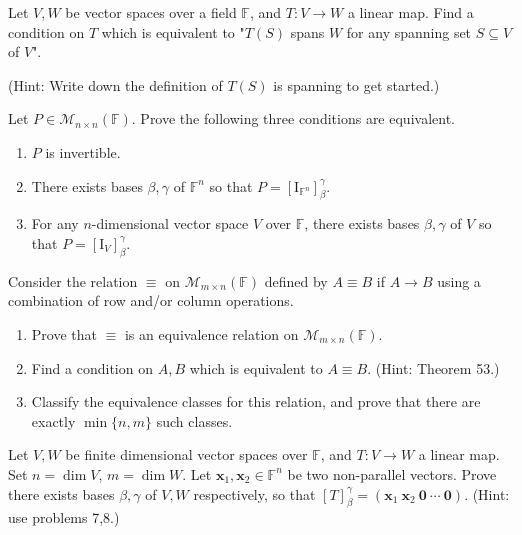 \documentclass{eh-homework}
\begin{document}
    \begin{question}{7}
        Let \( V, W \) be vector spaces over a field \( \mathbb{F} \), and \( T : V \to W \) a linear map. Find a condition on \( T \) which is equivalent to "\( T(S) \) spans \( W \) for any spanning set \( S \subseteq V \) of \( V \)".

        (Hint: Write down the definition of \( T(S) \) is spanning to get started.)
    \end{question}

    \begin{question}{8}
        Let \( P \in \mathcal{M}_{n \times n}(\mathbb{F}) \). Prove the following three conditions are equivalent.

        \begin{enumerate}
            \item \( P \) is invertible.
            \item There exists bases \( \beta, \gamma \) of \( \mathbb{F}^n \) so that \( P = [\mathrm{I}_{\mathbb{F}^n}]_\beta^\gamma \).
            \item For any \( n \)-dimensional vector space \( V \) over \( \mathbb{F} \), there exists bases \( \beta, \gamma \) of \( V \) so that \( P = [\mathrm{I}_V]_\beta^\gamma \).
        \end{enumerate}
    \end{question}

    \begin{question}{9}
        Consider the relation \( \equiv \) on \( \mathcal{M}_{m \times n}(\mathbb{F}) \) defined by \( A \equiv B \) if \( A \to B \) using a combination of row and/or column operations.

        \begin{enumerate}
            \item Prove that \( \equiv \) is an equivalence relation on \( \mathcal{M}_{m \times n}(\mathbb{F}) \).
            \item Find a condition on \( A, B \) which is equivalent to \( A \equiv B \). (Hint: Theorem 53.)
            \item Classify the equivalence classes for this relation, and prove that there are exactly \( \min\{n, m\} \) such classes.
        \end{enumerate}
    \end{question}

    \begin{question}{10}
        Let \( V, W \) be finite dimensional vector spaces over \( \mathbb{F} \), and \( T : V \to W \) a linear map. Set \( n = \dim V \), \( m = \dim W \). Let \( \mathbf{x}_1, \mathbf{x}_2 \in \mathbb{F}^n \) be two non-parallel vectors. Prove there exists bases \( \beta, \gamma \) of \( V, W \) respectively, so that \( [T]_\beta^\gamma = (\mathbf{x}_1 \ \mathbf{x}_2 \ \mathbf{0} \ \cdots \ \mathbf{0}) \). (Hint: use problems 7,8.)
    \end{question}
\end{document}
